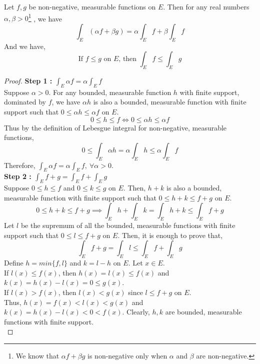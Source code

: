 \begin{theorem}
	Let $f,g$ be non-negative, measurable functions on $E$. Then for any real numbers $\alpha,\beta > 0$\dag\footnote{
		We know that $\alpha f + \beta g$ is non-negative only when $\alpha$ and $\beta$ are non-negative.}
	, we have
	\begin{equation}
		\int_E (\alpha f + \beta g)  = \alpha \int_E f + \beta \int_E f
	\end{equation}
	And we have,
	\begin{equation}
		\text{If } f \le g \text{ on $E$, then } \int_E f \le \int_E g
	\end{equation}
\end{theorem}
\begin{proof}
	\textbf{Step 1 : $\displaystyle \int_E \alpha f = \alpha \int_E f$}\\
	Suppose $\alpha > 0$.
	For any bounded, measurable function $h$ with finite support, dominated by $f$, we have $\alpha h$ is also a bounded, measurable function with finite support such that $0 \le \alpha h \le \alpha f$ on $E$.
	\[ 0 \le h \le f \iff 0 \le \alpha h \le \alpha f \]
	Thus by the definition of Lebesgue integral for non-negative, measurable functions,
	\[ 0 \le \int_E \alpha h  = \alpha \int_E h \le \alpha \int_E f \]
	Therefore, $\displaystyle \int_E \alpha f = \alpha \int_E f,\ \forall \alpha > 0$.\\

	\textbf{Step 2 : $\displaystyle \int_E f+g = \int_E f + \int_E g$}\\
	Suppose $0 \le h \le f$ and $0 \le k \le g$ on $E$.
	Then, $h+k$ is also a bounded, measurable function with finite support such that $0 \le h+k \le f+g$ on $E$.
	\begin{equation}
		0 \le h+k \le f+g \implies \int_E h + \int_E k = \int_E h+k \le \int_E f+g 
	\end{equation}
	Let $l$ be the supremum of all the bounded, measurable functions with finite support such that $0 \le l \le f+g$ on $E$.
	Then, it is enough to prove that,
	\[ \int_E f+g = \int_E l \le \int_E f + \int_E g \]
	Define $h = min\{f,l\}$ and $k = l -h$ on $E$.
	Let $x \in E$.\\
	If $l(x) \le f(x)$, then $h(x) = l(x) \le f(x)$ and $k(x) = h(x) - l(x) = 0 \le g(x)$.\\
	If $l(x) > f(x)$, then $l(x) < g(x)$ since $l \le f+g$ on $E$.\\
	Thus, $h(x) = f(x) < l(x) < g(x)$ and $k(x) = h(x) - l(x) < 0 < f(x)$.
	Clearly, $h,k$ are bounded, measurable functions with finite support.\\


\end{proof}
